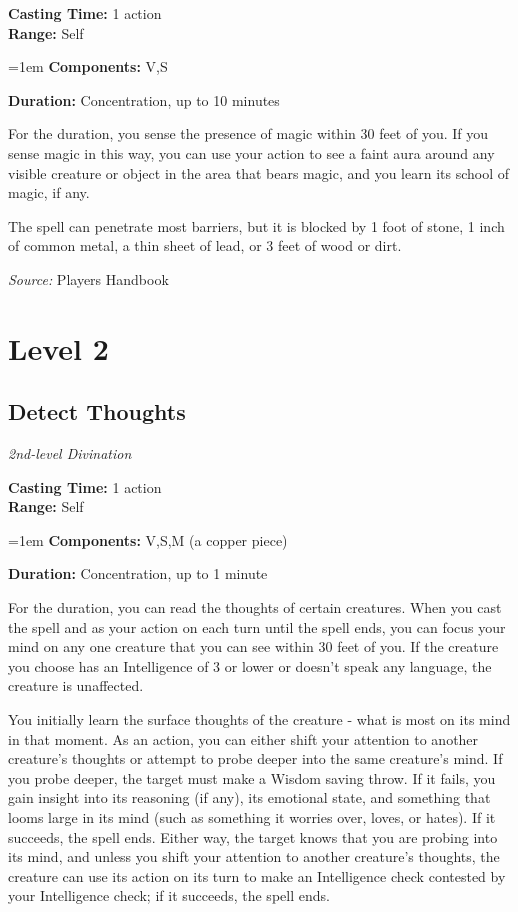 \documentclass[10pt,twoside,twocolumn]{article}
\begin{document}
\noindent
\textbf{Casting Time:}  1 action\\
\textbf{Range:}  Self

\noindent
\hangindent=1em
\textbf{Components:}  V,S

\noindent
\textbf{Duration:}  Concentration, up to 10 minutes\\
\smallskip



For the duration, you sense the presence of magic within 30 feet of you. If you sense magic in this way, you can use your action to see a faint aura around any visible creature or object in the area that bears magic, and you learn its school of magic, if any.

The spell can penetrate most barriers, but it is blocked by 1 foot of stone, 1 inch of common metal, a thin sheet of lead, or 3 feet of wood or dirt.



\textit{Source:} Players Handbook

\vfill
\section{Level 2}
\subsection{Detect Thoughts}
\textit{2nd-level Divination}
\smallskip

\noindent
\textbf{Casting Time:}  1 action\\
\textbf{Range:}  Self

\noindent
\hangindent=1em
\textbf{Components:}  V,S,M (a copper piece)

\noindent
\textbf{Duration:}  Concentration, up to 1 minute\\
\smallskip



For the duration, you can read the thoughts of certain creatures. When you cast the spell and as your action on each turn until the spell ends, you can focus your mind on any one creature that you can see within 30 feet of you. If the creature you choose has an Intelligence of 3 or lower or doesn't speak any language, the creature is unaffected.

You initially learn the surface thoughts of the creature - what is most on its mind in that moment. As an action, you can either shift your attention to another creature's thoughts or attempt to probe deeper into the same creature's mind. If you probe deeper, the target must make a Wisdom saving throw. If it fails, you gain insight into its reasoning (if any), its emotional state, and something that looms large in its mind (such as something it worries over, loves, or hates). If it succeeds, the spell ends. Either way, the target knows that you are probing into its mind, and unless you shift your attention to another creature's thoughts, the creature can use its action on its turn to make an Intelligence check contested by your Intelligence check; if it succeeds, the spell ends.
\end{document}
